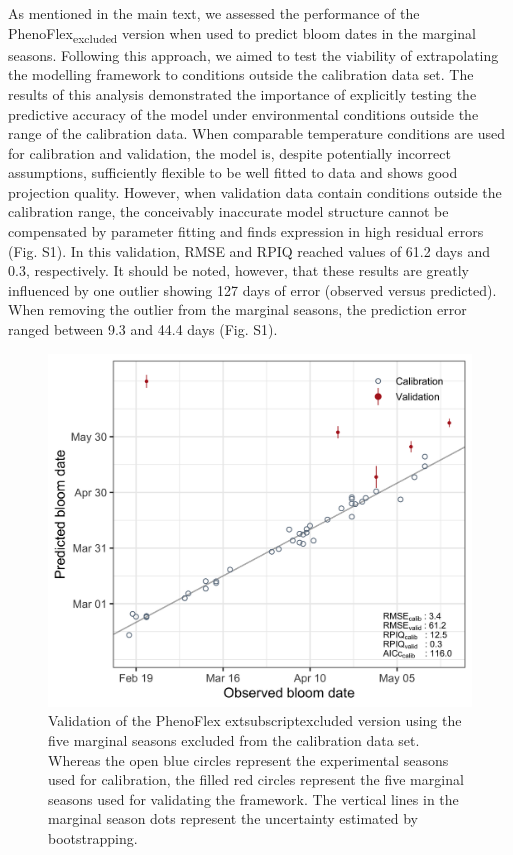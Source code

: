 \documentclass[
]{article}
\begin{document}
As mentioned in the main text, we assessed the performance of the
PhenoFlex\textsubscript{excluded} version when used to predict bloom
dates in the marginal seasons. Following this approach, we aimed to test
the viability of extrapolating the modelling framework to conditions
outside the calibration data set. The results of this analysis
demonstrated the importance of explicitly testing the predictive
accuracy of the model under environmental conditions outside the range
of the calibration data. When comparable temperature conditions are used
for calibration and validation, the model is, despite potentially
incorrect assumptions, sufficiently flexible to be well fitted to data
and shows good projection quality. However, when validation data contain
conditions outside the calibration range, the conceivably inaccurate
model structure cannot be compensated by parameter fitting and finds
expression in high residual errors (Fig. S1). In this validation, RMSE
and RPIQ reached values of 61.2 days and 0.3, respectively. It should be
noted, however, that these results are greatly influenced by one outlier
showing 127 days of error (observed versus predicted). When removing the
outlier from the marginal seasons, the prediction error ranged between
9.3 and 44.4 days (Fig. S1).

\begin{figure}

{\centering \includegraphics[width=1\linewidth]{figures/final_figures/Figure_S1} 

}

\caption{Validation of the PhenoFlex    extsubscript{excluded} version using the five marginal seasons excluded from the calibration data set. Whereas the open blue circles represent the experimental seasons used for calibration, the filled red circles represent the five marginal seasons used for validating the framework. The vertical lines in the marginal season dots represent the uncertainty estimated by bootstrapping.}\label{fig:fig_s4}
\end{figure}
\end{document}
